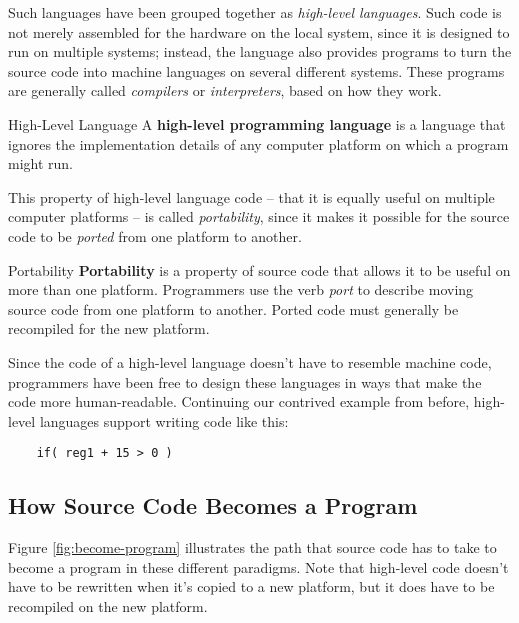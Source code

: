 Such languages have been grouped together as \textit{high-level languages}.  Such code is not merely assembled for the hardware on the local system, since it is designed to run on multiple systems; instead, the language also provides programs to turn the source code into machine languages on several different systems.  These programs are generally called \textit{compilers} or \textit{interpreters}, based on how they work.

\begin{defn}{High-Level Language}
    A \textbf{high-level programming language} is a language that ignores the implementation details of any computer platform on which a program might run.
\end{defn}

This property of high-level language code -- that it is equally useful on multiple computer platforms -- is called \textit{portability}, since it makes it possible for the source code to be \textit{ported} from one platform to another.

\begin{defn}{Portability}
    \textbf{Portability} is a property of source code that allows it to be useful on more than one platform.  Programmers use the verb \textit{port} to describe moving source code from one platform to another.  Ported code must generally be recompiled for the new platform.
\end{defn}

Since the code of a high-level language doesn't have to resemble machine code, programmers have been free to design these languages in ways that make the code more human-readable.  Continuing our contrived example from before, high-level languages support writing code like this:

\begin{verbatim}
    if( reg1 + 15 > 0 )
\end{verbatim}

\subsection{How Source Code Becomes a Program}

Figure \ref{fig:become-program} illustrates the path that source code has to take to become a program in these different paradigms.  Note that high-level code doesn't have to be rewritten when it's copied to a new platform, but it does have to be recompiled on the new platform.

